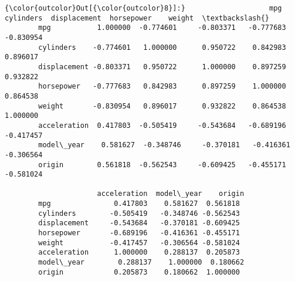 \documentclass[11pt]{article}
\begin{document}
\begin{Verbatim}[commandchars=\\\{\}]
{\color{outcolor}Out[{\color{outcolor}8}]:}                    mpg  cylinders  displacement  horsepower    weight  \textbackslash{}
        mpg           1.000000  -0.774601     -0.803371   -0.777683 -0.830954   
        cylinders    -0.774601   1.000000      0.950722    0.842983  0.896017   
        displacement -0.803371   0.950722      1.000000    0.897259  0.932822   
        horsepower   -0.777683   0.842983      0.897259    1.000000  0.864538   
        weight       -0.830954   0.896017      0.932822    0.864538  1.000000   
        acceleration  0.417803  -0.505419     -0.543684   -0.689196 -0.417457   
        model\_year    0.581627  -0.348746     -0.370181   -0.416361 -0.306564   
        origin        0.561818  -0.562543     -0.609425   -0.455171 -0.581024   
        
                      acceleration  model\_year    origin  
        mpg               0.417803    0.581627  0.561818  
        cylinders        -0.505419   -0.348746 -0.562543  
        displacement     -0.543684   -0.370181 -0.609425  
        horsepower       -0.689196   -0.416361 -0.455171  
        weight           -0.417457   -0.306564 -0.581024  
        acceleration      1.000000    0.288137  0.205873  
        model\_year        0.288137    1.000000  0.180662  
        origin            0.205873    0.180662  1.000000  
\end{Verbatim}
            
\end{document}
